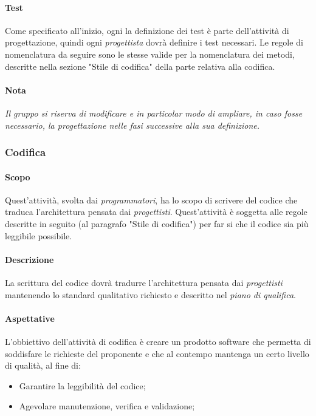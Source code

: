 \documentclass[../norme_di_progetto.tex]{subfiles}
\begin{document}
 
 \paragraph{Test}
  Come specificato all'inizio, ogni la definizione dei test è parte dell'attività di progettazione, quindi ogni \emph{progettista} dovrà definire i test necessari. Le regole di nomenclatura da seguire sono le stesse valide per la nomenclatura dei metodi, descritte nella sezione "Stile di codifica" della parte relativa alla codifica.
  
  \paragraph{Nota}
  \emph{Il gruppo si riserva di modificare e in particolar modo di ampliare, in caso fosse necessario, la progettazione nelle fasi successive alla sua definizione.}
  
  \subsubsection{Codifica}
 
 \paragraph{Scopo}
    Quest'attività, svolta dai \emph{programmatori}, ha lo scopo di scrivere del codice che traduca l'architettura pensata dai \emph{progettisti}. Quest'attività è soggetta alle regole descritte in seguito (al paragrafo "Stile di codifica") per far si che il codice sia più leggibile possibile.
 
 \paragraph{Descrizione}
 La scrittura del codice dovrà tradurre l'architettura pensata dai \emph{progettisti} mantenendo lo standard qualitativo richiesto e descritto nel \emph{piano di qualifica}.
 
 \paragraph{Aspettative}
 L'obbiettivo dell'attività di codifica è creare un prodotto software che permetta di soddisfare le richieste del proponente e che al contempo mantenga un certo livello di qualità, al fine di:
 \begin{itemize}
     \item Garantire la leggibilità del codice;
     \item Agevolare manutenzione, verifica e validazione;
 \end{itemize}
 
\end{document}
